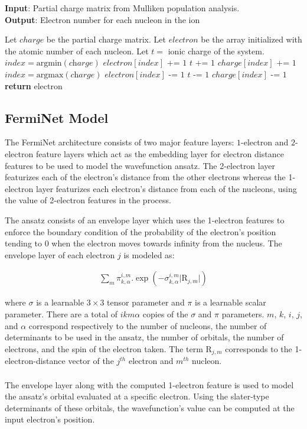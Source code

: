 \documentclass[letterpaper]{article} %
\begin{document}
\begin{algorithm}[tb]
\caption{Charge Initialization Policy}
\label{alg:algorithm}
\textbf{Input}: Partial charge matrix from Mulliken population analysis.\\
\textbf{Output}: Electron number for each nucleon in the ion
\begin{algorithmic}[1] %
\STATE Let $charge$ be the partial charge matrix.
\STATE Let $electron$ be the array initialized with the atomic number of each nucleon.
\STATE Let $t=$ ionic charge of the system.
\STATE $index = \text{argmin}(\textit{charge})$
\STATE $electron[index]$ += $1$
\STATE $t$ += $1$
\STATE $charge[index]$ += $1$
\ELSE
\STATE $index = \text{argmax}(\textit{charge})$
\STATE $electron[index]$ -= $1$
\STATE $t$ -= $1$
\STATE $charge[index]$ -= $1$
\ENDIF
\ENDWHILE
\STATE \textbf{return} electron
\end{algorithmic}
\end{algorithm}



\subsection{FermiNet Model}
The FermiNet architecture consists of two major feature layers: $1$-electron and $2$-electron feature layers which act as the embedding layer for electron distance features to be used to model the wavefunction ansatz. The 2-electron layer featurizes each of the electron's distance from the other electrons whereas the 1-electron layer featurizes each electron's distance from each of the nucleons, using the value of 2-electron features in the process.

The ansatz consists of an envelope layer which uses the 1-electron features to enforce the boundary condition of the probability of the electron's position tending to 0 when the electron moves towards infinity from the nucleus. The envelope layer of each electron $j$ is modeled as:

\begin{align}
\sum_{m}^{} \pi_{k,\alpha}^{i,m} . \exp(-\sigma_{k,\alpha}^{i,m} \lvert \text{R}_{j,m} \rvert)
\end{align}

\noindent where \(\sigma\) is a learnable \(3 \times 3\) tensor parameter and \(\pi\) is a learnable scalar parameter. There are a total of $ikm$\(\alpha\) copies of the \(\sigma\) and \(\pi\) parameters. $m$, $k$, $i$, $j$, and \(\alpha\) correspond respectively to the number of nucleons, the number of determinants to be used in the ansatz, the number of orbitals, the number of electrons, and the spin of the electron taken. The term \(\text{R}_{j,m}\) corresponds to the 1-electron-distance vector of the \(j_{}^{th}\) electron and \(m_{}^{th}\) nucleon.\\ \\
The envelope layer along with the computed 1-electron feature is used to model the ansatz's orbital evaluated at a specific electron. Using the slater-type determinants of these orbitals, the wavefunction's value can be computed at the input electron's position.
\end{document}
